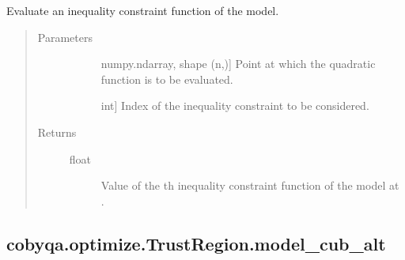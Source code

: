 \documentclass[letterpaper,10pt,english]{sphinxmanual}
\begin{document}
\begin{fulllineitems}
\begin{fulllineitems}
\label{\detokenize{refs/generated/cobyqa.optimize.TrustRegion.model_cub:cobyqa.optimize.TrustRegion.model_cub}}
\sphinxAtStartPar
Evaluate an inequality constraint function of the model.
\begin{quote}\begin{description}
\item[{Parameters}] \leavevmode\begin{description}
\item[{}] \leavevmode{[}numpy.ndarray, shape (n,){]}
\sphinxAtStartPar
Point at which the quadratic function is to be evaluated.

\item[{}] \leavevmode{[}int{]}
\sphinxAtStartPar
Index of the inequality constraint to be considered.

\end{description}

\item[{Returns}] \leavevmode\begin{description}
\item[{float}] \leavevmode
\sphinxAtStartPar
Value of the \sphinxhyphen{}th inequality constraint function of the model at
.

\end{description}

\end{description}\end{quote}

\end{fulllineitems}



\subsection{cobyqa.optimize.TrustRegion.model\_cub\_alt}
\label{\detokenize{refs/generated/cobyqa.optimize.TrustRegion.model_cub_alt:cobyqa-optimize-trustregion-model-cub-alt}}\label{\detokenize{refs/generated/cobyqa.optimize.TrustRegion.model_cub_alt::doc}}


\end{fulllineitems}
\end{document}

